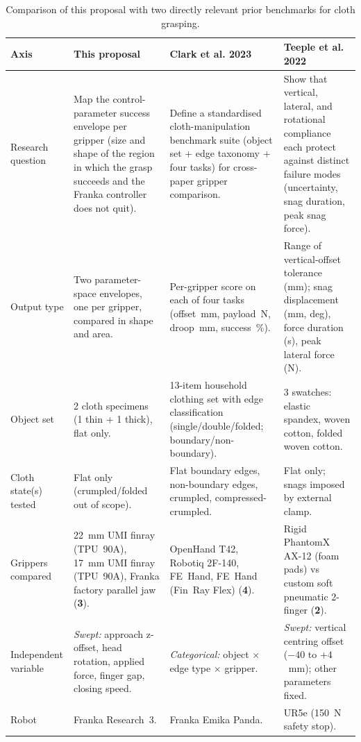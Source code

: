 \documentclass[10pt,letterpaper]{article}
\begin{document}
\begin{table}[!t]
\centering
\caption{Comparison of this proposal with two directly relevant prior benchmarks for cloth grasping.}
\label{tab:comparison}
\footnotesize
\renewcommand{\arraystretch}{1.25}
\begin{tabularx}{\textwidth}{@{}L{2.5cm} X X X@{}}
\toprule
\textbf{Axis} & \textbf{This proposal} & \textbf{Clark et al. 2023~\cite{Clark2023}} & \textbf{Teeple et al. 2022~\cite{Teeple2022}} \\
\midrule
Research question
  & Map the control-parameter success envelope per gripper (size and shape of the region in which the grasp succeeds and the Franka controller does not quit).
  & Define a standardised cloth-manipulation benchmark suite (object set + edge taxonomy + four tasks) for cross-paper gripper comparison.
  & Show that vertical, lateral, and rotational compliance each protect against distinct failure modes (uncertainty, snag duration, peak snag force). \\
Output type
  & Two parameter-space envelopes, one per gripper, compared in shape and area.
  & Per-gripper score on each of four tasks (offset~mm, payload~N, droop~mm, success~\%).
  & Range of vertical-offset tolerance (mm); snag displacement (mm, deg), force duration (s), peak lateral force (N). \\
Object set
  & 2 cloth specimens (1 thin + 1 thick), flat only.
  & 13-item household clothing set with edge classification (single/double/folded; boundary/non-boundary).
  & 3 swatches: elastic spandex, woven cotton, folded woven cotton. \\
Cloth state(s) tested
  & Flat only (crumpled/folded out of scope).
  & Flat boundary edges, non-boundary edges, crumpled, compressed-crumpled.
  & Flat only; snags imposed by external clamp. \\
Grippers compared
  & 22~mm UMI finray (TPU~90A), 17~mm UMI finray (TPU~90A), Franka factory parallel jaw (\textbf{3}).
  & OpenHand T42, Robotiq 2F-140, FE~Hand, FE~Hand (Fin~Ray Flex) (\textbf{4}).
  & Rigid PhantomX AX-12 (foam pads) vs custom soft pneumatic 2-finger (\textbf{2}). \\
Independent variable
  & \emph{Swept:} approach z-offset, head rotation, applied force, finger gap, closing speed.
  & \emph{Categorical:} object $\times$ edge type $\times$ gripper.
  & \emph{Swept:} vertical centring offset (\(-40\) to \(+4\)~mm); other parameters fixed. \\
Robot
  & Franka Research~3.
  & Franka Emika Panda.
  & UR5e (150~N safety stop). \\

\end{tabularx}
\end{table}
\end{document}

